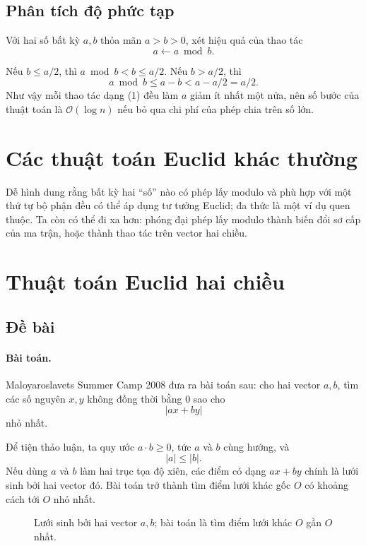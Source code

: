 \documentclass[11pt]{article}
\newcommand{\Oh}{\mathcal{O}}
\newcommand{\abs}[1]{\left|#1\right|}
\begin{document}
\subsection{Phân tích độ phức tạp}

Với hai số bất kỳ $a,b$ thỏa mãn $a>b>0$, xét hiệu quả của thao tác
\[
  a\gets a\bmod b. \tag{1}
\]

Nếu $b\le a/2$, thì $a\bmod b<b\le a/2$. Nếu $b>a/2$, thì
\[
  a\bmod b\le a-b<a-a/2=a/2.
\]
Như vậy mỗi thao tác dạng (1) đều làm $a$ giảm ít nhất một nửa, nên số bước
của thuật toán là $\Oh(\log n)$ nếu bỏ qua chi phí của phép chia trên số lớn.

\section{Các thuật toán Euclid khác thường}

Dễ hình dung rằng bất kỳ hai ``số'' nào có phép lấy modulo và phù hợp với một
thứ tự bộ phận đều có thể áp dụng tư tưởng Euclid; đa thức là một ví dụ quen
thuộc. Ta còn có thể đi xa hơn: phóng đại phép lấy modulo thành biến đổi sơ
cấp của ma trận, hoặc thành thao tác trên vector hai chiều.

\section{Thuật toán Euclid hai chiều}

\subsection{Đề bài}

\paragraph{Bài toán.}
Maloyaroslavets Summer Camp 2008 đưa ra bài toán sau: cho hai vector $a,b$,
tìm các số nguyên $x,y$ không đồng thời bằng $0$ sao cho
\[
  \abs{ax+by}
\]
nhỏ nhất.

Để tiện thảo luận, ta quy ước $a\cdot b\ge 0$, tức $a$ và $b$ cùng hướng, và
\[
  \abs a\le \abs b.
\]
Nếu dùng $a$ và $b$ làm hai trục tọa độ xiên, các điểm có dạng $ax+by$ chính
là lưới sinh bởi hai vector đó. Bài toán trở thành tìm điểm lưới khác gốc
$O$ có khoảng cách tới $O$ nhỏ nhất.

\begin{figure}[ht]
\centering
{}
\caption{Lưới sinh bởi hai vector \(a,b\); bài toán là tìm điểm lưới khác \(O\) gần \(O\) nhất.}
\end{figure}
\end{document}
